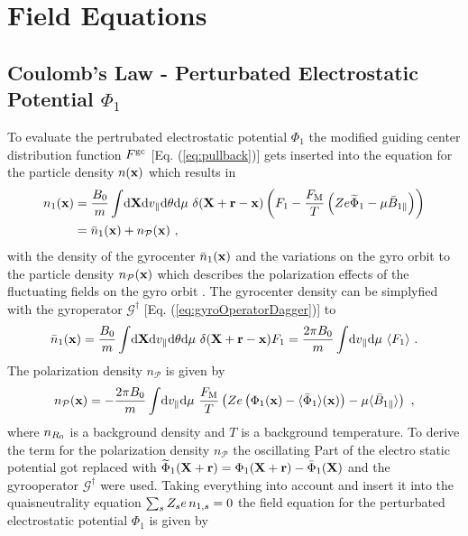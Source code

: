 \section{Field Equations}
\label{sec:fieldEquations}

\subsection{Coulomb's Law - Perturbated Electrostatic Potential $\Phi_1$}
\label{sub:fieldPotential}

To evaluate the pertrubated electrostatic potential $\Phi_1$ the modified guiding center distribution function $F^\mathrm{gc}$ [Eq. (\ref{eq:pullback})] gets inserted into the equation for the particle density $n(\boldsymbol{\mathbf{x}})$ which results in
\begin{gather}
	\begin{aligned}
		n_1(\boldsymbol{\mathbf{x}}) &= \frac{B_0}{m} \int \! \mathrm{d}\boldsymbol{\mathbf{X}}\mathrm{d}v_\parallel\mathrm{d}\theta\mathrm{d}\mu ~ \delta(\boldsymbol{\mathbf{X}} + \boldsymbol{\mathbf{r}} - \boldsymbol{\mathbf{x}}) \left(F_1 - \frac{F_\mathrm{M}}{T}\left(Ze \widetilde{\Phi}_1 - \mu \bar{B}_{1\parallel}\right) \right)\\
		     &= \bar{n}_1(\boldsymbol{\mathbf{x}}) + n_\mathcal{P}(\boldsymbol{\mathbf{x}})~,
	\end{aligned}
	\label{densityPullback}
\end{gather}
with the density of the gyrocenter $\bar{n}_1(\boldsymbol{\mathbf{x}})$ and the variations on the gyro orbit to the particle density $n_\mathcal{P}(\boldsymbol{\mathbf{x}})$ which describes the polarization effects of the fluctuating fields on the gyro orbit \cite{Brizard2007}. The gyrocenter density can be simplyfied with the gyroperator $\mathcal{G}^\dagger$ [Eq. (\ref{eq:gyroOperatorDagger})] to
\begin{gather}
		\bar{n}_1(\boldsymbol{\mathbf{x}}) = \frac{B_0}{m} \int \! \mathrm{d}\boldsymbol{\mathbf{X}}\mathrm{d}v_\parallel\mathrm{d}\theta\mathrm{d}\mu ~ \delta(\boldsymbol{\mathbf{X}} + \boldsymbol{\mathbf{r}} - \boldsymbol{\mathbf{x}}) F_1 = \frac{2\pi B_0}{m} \int \! \mathrm{d}v_\parallel\mathrm{d}\mu ~ \langle F_1\rangle~.
	\label{eq:gyrocenterDensity}
\end{gather}
The polarization density $n_\mathcal{P}$ is given by
\begin{gather}
	n_\mathcal{P}(\boldsymbol{\mathbf{x}}) =  - \frac{2\pi B_0}{m} \int \! \mathrm{d}v_\parallel\mathrm{d}\mu ~ \frac{F_\mathrm{M}}{T} \left( Ze \left(\Phi_1(\boldsymbol{\mathbf{x}}) - \langle\bar{\Phi}_1\rangle(\boldsymbol{\mathbf{x}}) \right) -  \mu \langle\bar{B}_{1\parallel}\rangle \right) ~,
	\label{eq:polarizationDensity}
\end{gather}
where $n_{R_0}$ is a background density and $T$ is a background temperature. To derive the term for the polarization density $n_\mathcal{P}$ the oscillating Part of the electro static potential got replaced with $\widetilde{\Phi}_1(\boldsymbol{\mathbf{X}}+ \boldsymbol{\mathbf{r}}) = \Phi_1(\boldsymbol{\mathbf{X}} + \boldsymbol{\mathbf{r}}) - \bar{\Phi}_1 (\boldsymbol{\mathbf{X}})$ and the gyrooperator $\mathcal{G}^\dagger$ were used. Taking everything into account and insert it into the quaisneutrality equation $\sum_s Z_s e \, n_{1,s} = 0$ the field equation for the perturbated electrostatic potential $\Phi_1$ is given by
